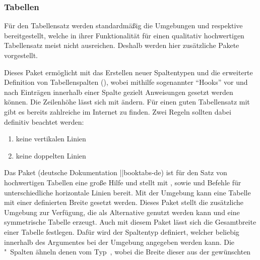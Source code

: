 \subsubsection{%
  Tabellen%
}
%
Für den Tabellensatz werden standardmäßig die Umgebungen  
und  respektive  bereitgestellt, 
welche in ihrer Funktionalität für einen qualitativ hochwertigen Tabellensatz 
meist nicht ausreichen. Deshalb werden hier zusätzliche Pakete vorgestellt. 
%
\begin{DeclarePackages}
  Dieses Paket ermöglicht mit  das Erstellen neuer 
  Spaltentypen und die erweiterte Definition von Tabellenspalten
  (\PValue{>\MPValue{\dots}}\PValue{<\MPValue{\dots}}), 
  wobei mithilfe sogenannter \enquote{Hooks} vor und nach Einträgen innerhalb 
  einer Spalte gezielt Anweisungen gesetzt werden können. Die Zeilenhöhe lässt 
  sich mit  ändern. 
  Für einen guten Tabellensatz mit  gibt es bereits zahlreiche 
   im 
  Internet zu finden. Zwei Regeln sollten dabei definitiv beachtet werden:
  \begin{enumerate}[itemindent=0pt,labelwidth=*,labelsep=1em,label=\Roman*.]
  \item keine vertikalen Linien
  \item keine doppelten Linien
  \end{enumerate}
  Das Paket  (deutsche Dokumentation \Package||{booktabs-de}) 
  ist für den Satz von hochwertigen Tabellen eine große Hilfe und stellt mit 
  ,  sowie  und 
  Befehle für unterschiedliche horizontale Linien bereit.
  Mit der Umgebung  kann eine Tabelle mit einer 
  definierten Breite gesetzt werden. Dieses Paket stellt die zusätzliche 
  Umgebung  zur Verfügung, die als Alternative genutzt 
  werden kann und eine symmetrische Tabelle erzeugt.
  Auch mit diesem Paket lässt sich die Gesamtbreite einer Tabelle festlegen. 
  Dafür wird der Spaltentyp  definiert, welcher beliebig innerhalb 
  des Argumentes  bei der Umgebung 
  angegeben werden kann. Die "~Spalten ähneln denen vom 
  Typ~, wobei die Breite dieser aus der gewünschten 

\end{DeclarePackages}
